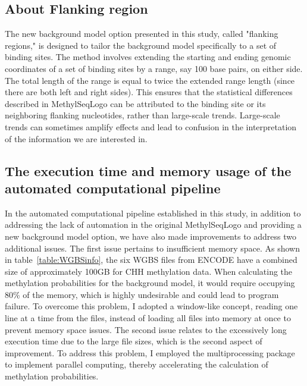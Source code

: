 \documentclass{PHlab-thesis}
\begin{document}
\subsection{About Flanking region}
The new background model option presented in this study, called "flanking regions," is designed to tailor the background model specifically to a set of binding sites. The method involves extending the starting and ending genomic coordinates of a set of binding sites by a range, say 100 base pairs, on either side. The total length of the range is equal to twice the extended range length (since there are both left and right sides). This ensures that the statistical differences described in MethylSeqLogo can be attributed to the binding site or its neighboring flanking nucleotides, rather than large-scale trends. Large-scale trends can sometimes amplify effects and lead to confusion in the interpretation of the information we are interested in.
\subsection{The execution time and memory usage of the automated computational pipeline }
In the automated computational pipeline established in this study, in addition to addressing the lack of automation in the original MethylSeqLogo and providing a new background model option, we have also made improvements to address two additional issues. The first issue pertains to insufficient memory space. As shown in table~\ref{table:WGBSinfo}, the six WGBS files from ENCODE have a combined size of approximately 100GB for CHH methylation data. When calculating the methylation probabilities for the background model, it would require occupying 80\% of the memory, which is highly undesirable and could lead to program failure. To overcome this problem, I adopted a window-like concept, reading one line at a time from the files, instead of loading all files into memory at once to prevent memory space issues.
The second issue relates to the excessively long execution time due to the large file sizes, which is the second aspect of improvement. To address this problem, I employed the multiprocessing package to implement parallel computing, thereby accelerating the calculation of methylation probabilities.
	
\end{document}

